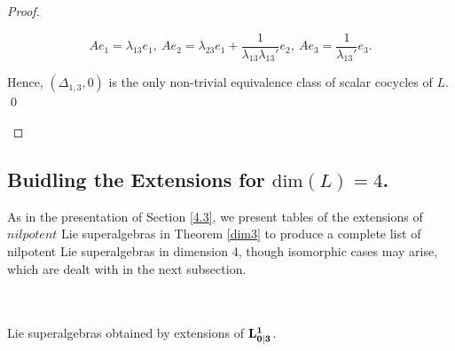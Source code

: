 \documentclass[12pt]{amsart}
\begin{document}
{\begin{proof}
\begin{itemize}
$$Ae_1=\lambda_{13}e_1, ~Ae_2=\lambda_{23}e_1+\frac{1}{\lambda_{13}\lambda_{13}'}e_2, ~Ae_3=\frac{1}{\lambda_{13}'}e_3.$$ 

Hence, $(\Delta_{1,3},0)$ is the only non-trivial equivalence class of scalar cocycles of $L$. \qed  
\end{itemize} \noqed
\end{proof}

\subsection{Buidling the Extensions for \texorpdfstring{$\mathrm{dim}(L)=4$.}{dim(L)=4}}\label{5.2} As in the presentation of Section \ref{4.3}, we present tables of the extensions of $nilpotent$ Lie superalgebras in Theorem \ref{dim3} to produce a complete list of nilpotent Lie superalgebras in dimension 4, though isomorphic cases may arise, which are dealt with in the next subsection.\\
\small
{\renewcommand{\arraystretch}{1.5}

\begin{center}
   \\~\\ Lie superalgebras obtained by extensions of ${\bf L^1_{0|3}}$.
\end{center}
}

\vspace{0.5 em}

}
\end{document}
